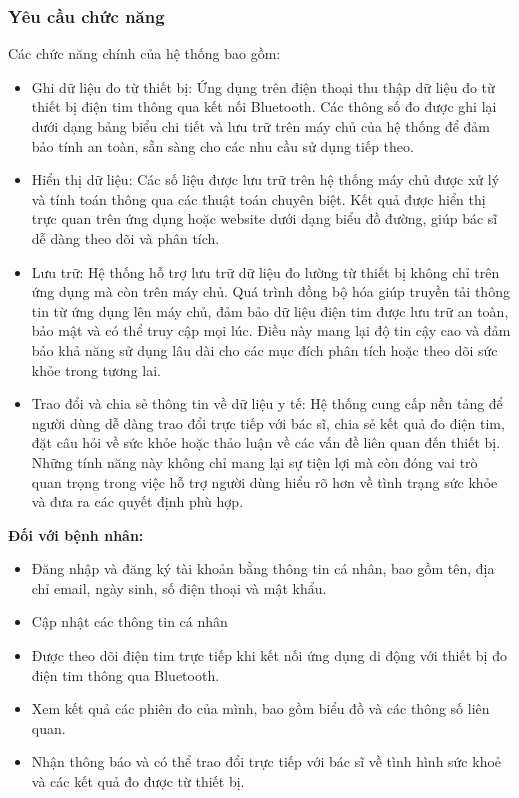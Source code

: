 \subsubsection{Yêu cầu chức năng}
Các chức năng chính của hệ thống bao gồm:
\begin{adjustwidth}{1.5em}{}
  \begin{itemize}
      \item Ghi dữ liệu đo từ thiết bị: Ứng dụng trên điện thoại thu thập dữ liệu đo từ thiết bị điện tim thông qua kết nối Bluetooth. Các thông số đo được ghi lại dưới dạng bảng biểu chi tiết và lưu trữ trên máy chủ của hệ thống để đảm bảo tính an toàn, sẵn sàng cho các nhu cầu sử dụng tiếp theo.
      \item Hiển thị dữ liệu: Các số liệu được lưu trữ trên hệ thống máy chủ được xử lý và tính toán thông qua các thuật toán chuyên biệt. Kết quả được hiển thị trực quan trên ứng dụng hoặc website dưới dạng biểu đồ đường, giúp bác sĩ dễ dàng theo dõi và phân tích.
      \item Lưu trữ: Hệ thống hỗ trợ lưu trữ dữ liệu đo lường từ thiết bị không chỉ trên ứng dụng mà còn trên máy chủ. Quá trình đồng bộ hóa giúp truyền tải thông tin từ ứng dụng lên máy chủ, đảm bảo dữ liệu điện tim được lưu trữ an toàn, bảo mật và có thể truy cập mọi lúc. Điều này mang lại độ tin cậy cao và đảm bảo khả năng sử dụng lâu dài cho các mục đích phân tích hoặc theo dõi sức khỏe trong tương lai.
      \item Trao đổi và chia sẻ thông tin về dữ liệu y tế: Hệ thống cung cấp nền tảng để người dùng dễ dàng trao đổi trực tiếp với bác sĩ, chia sẻ kết quả đo điện tim, đặt câu hỏi về sức khỏe hoặc thảo luận về các vấn đề liên quan đến thiết bị. Những tính năng này không chỉ mang lại sự tiện lợi mà còn đóng vai trò quan trọng trong việc hỗ trợ người dùng hiểu rõ hơn về tình trạng sức khỏe và đưa ra các quyết định phù hợp.

  \end{itemize}
\end{adjustwidth}
\textbf{Đối với bệnh nhân:}
\begin{adjustwidth}{1.5em}{}
\begin{itemize}
    \item Đăng nhập và đăng ký tài khoản bằng thông tin cá nhân, bao gồm tên, địa chỉ email, ngày sinh, số điện thoại và mật khẩu.
    \item Cập nhật các thông tin cá nhân
    \item Được theo dõi điện tim trực tiếp khi kết nối ứng dụng di động với thiết bị đo điện tim thông qua Bluetooth.
    \item Xem kết quả các phiên đo của mình, bao gồm biểu đồ và các thông số liên quan.
    \item Nhận thông báo và có thể trao đổi trực tiếp với bác sĩ về tình hình sức khoẻ và các kết quả đo được từ thiết bị.
\end{itemize}
\end{adjustwidth}
